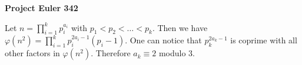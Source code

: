 \documentclass[a4paper,12pt]{article}
\begin{document}
\setlength\parindent{0pt}
\textbf{Project Euler 342}
\vspace{5ex}

Let \(n = \prod_{i = 1}^k p_i^{a_i}\) with \(p_1 < p_2 < \dots < p_k\). Then we have \(\varphi(n^2) = \prod_{i = 1}^k p_i^{2a_i - 1} (p_i - 1)\). One can notice that \(p_k^{2a_k - 1}\) is coprime with all other factors in \(\varphi(n^2)\). Therefore \(a_k \equiv 2\) modulo 3.
\end{document}
